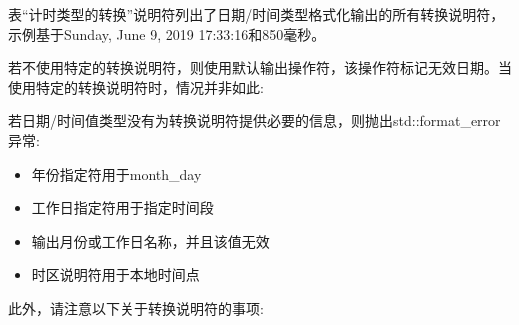 表“计时类型的转换”说明符列出了日期/时间类型格式化输出的所有转换说明符，示例基于Sunday, June 9, 2019 17:33:16和850毫秒。

若不使用特定的转换说明符，则使用默认输出操作符，该操作符标记无效日期。当使用特定的转换说明符时，情况并非如此:


若日期/时间值类型没有为转换说明符提供必要的信息，则抛出std::format\_error异常:

\begin{itemize}
\item
年份指定符用于month\_day

\item
工作日指定符用于指定时间段

\item
输出月份或工作日名称，并且该值无效

\item
时区说明符用于本地时间点
\end{itemize}

此外，请注意以下关于转换说明符的事项:

